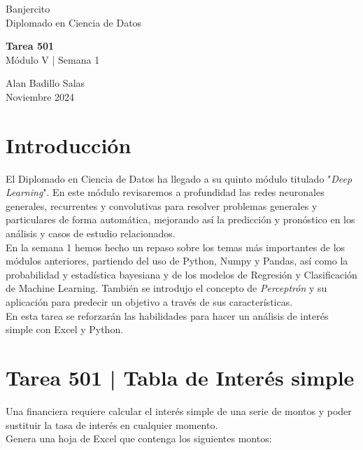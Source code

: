 \documentclass{article}
\begin{document}
\begin{flushleft}
    \LARGE Banjercito \\[6pt]
    \Large Diplomado en Ciencia de Datos
\end{flushleft}

\vfill

\begin{flushleft}
    \LARGE \textbf{Tarea 501} \\[12pt]
    \LARGE Módulo V | Semana 1 \\[24pt]
\end{flushleft}

\vfil

\begin{flushleft}
    Alan Badillo Salas \\[12pt]
    Noviembre 2024 \\[24pt]
\end{flushleft}

\vfill

\section*{Introducción}
El Diplomado en Ciencia de Datos ha llegado a su quinto módulo titulado "\textit{Deep Learning}". En este módulo revisaremos a profundidad las redes neuronales generales, recurrentes y convolutivas para resolver problemas generales y particulares de forma automática, mejorando así la predicción y pronóstico en los análisis y casos de estudio relacionados.
\\[12pt]
En la semana 1 hemos hecho un repaso sobre los temas más importantes de los módulos anteriores, partiendo del uso de Python, Numpy y Pandas, así como la probabilidad y estadística bayesiana y de los modelos de Regresión y Clasificación de Machine Learning. También se introdujo el concepto de \textit{Perceptrón} y su aplicación para predecir un objetivo a través de sus características.
\\[12pt]
En esta tarea se reforzarán las habilidades para hacer un análisis de interés simple con Excel y Python.

\clearpage

\section*{Tarea 501 | Tabla de Interés simple}

Una financiera requiere calcular el interés simple de una serie de montos y poder sustituir la tasa de interés en cualquier momento.
\\[12pt]
Genera una hoja de Excel que contenga los siguientes montos:
\end{document}
